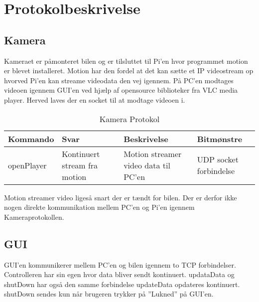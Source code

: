 \section{Protokolbeskrivelse}

\subsection{Kamera}

Kameraet er påmonteret bilen og er tilsluttet til Pi'en hvor programmet motion er blevet installeret. Motion har den fordel at det kan sætte et IP videostream op hvorved Pi’en kan streame videodata den vej igennem. På PC'en modtages videoen igennem GUI'en ved hjælp af opensource biblioteker fra VLC media player. Herved laves der en socket til at modtage videoen i.

\begin{table}[h]
\begin{tabularx}{\textwidth}{| Z | Z | Z | Z |} \hline

\textbf{Kommando} 						&
\textbf{Svar}							&
\textbf{Beskrivelse}					&
\textbf{Bitmønstre}						\\ \hline

openPlayer								&
Kontinuert stream fra motion			&
Motion streamer video data til PC'en	&
UDP socket forbindelse					\\ \hline

\end{tabularx}
\caption{Kamera Protokol}
\label{tbl:prt_cam}
\end{table}

Motion streamer video ligeså snart der er tændt for bilen. Der er derfor ikke nogen direkte kommunikation mellem PC'en og Pi'en igennem Kameraprotokollen.


\subsection{GUI}

GUI'en kommunikerer mellem PC'en og bilen igennem to TCP forbindelser. Controlleren har sin egen hvor data bliver sendt kontinuert. updataData og shutDown har også den samme forbindelse updateData opdateres kontinuert. shutDown sendes kun når brugeren trykker på ''Lukned'' på GUI'en. 

